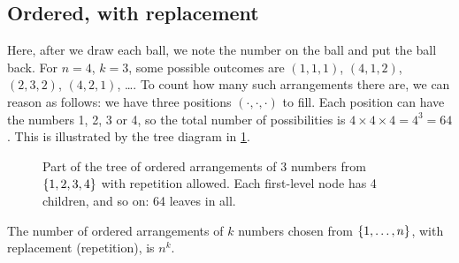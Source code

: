 \subsection{Ordered, with replacement}\label{sec:count-ordered-with}

Here, after we draw each ball, we note the number on the ball and put the ball back. For $n = 4$, $k = 3$, some possible outcomes are $(1,1,1)$, $(4,1,2)$, $(2,3,2)$, $(4,2,1)$, \ldots. To count how many such arrangements there are, we can reason as follows: we have three positions $(\cdot, \cdot, \cdot)$ to fill. Each position can have the numbers 1, 2, 3 or 4, so the total number of possibilities is $4 \times 4 \times 4 = 4^3 = 64$. This is illustrated by the tree diagram in \cref{fig:tree-with-duplication}.

\begin{figure}[H]
\centering
{}
\caption{Part of the tree of ordered arrangements of 3 numbers from $\left\{ 1, 2, 3, 4 \right\}$ with repetition allowed. Each first-level node has 4 children, and so on: 64 leaves in all.}
\label{fig:tree-with-duplication}
\end{figure}

\begin{theorem}\label{thm:count-ordered-with-replacement}
The number of ordered arrangements of $k$ numbers chosen from $\left\{ 1, \ldots, n \right\}$, with replacement (repetition), is $n^k$.
\end{theorem}

